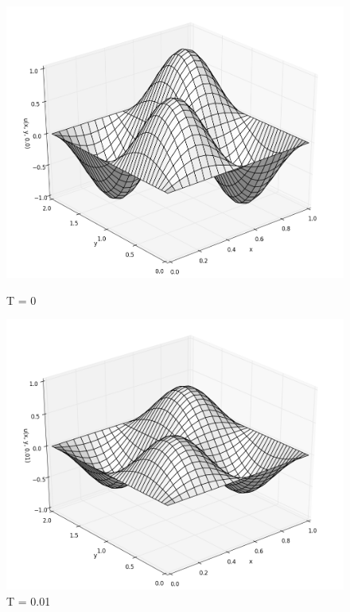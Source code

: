\documentclass[12pt]{article}
\begin{document}
		\begin{figure}[h!]
			\begin{minipage}[h]{0.5\linewidth}
				\includegraphics[width=\linewidth]{solution_t00}
				\caption{T = 0}
			\end{minipage}
			\hfill
			\begin{minipage}[h]{0.5\linewidth}
				\includegraphics[width=\linewidth]{solution_t01}
				\caption{T = 0.01}
			\end{minipage}
			\vfill
			\begin{minipage}[h]{0.5\linewidth}

\end{minipage}
\end{figure}
\end{document}
